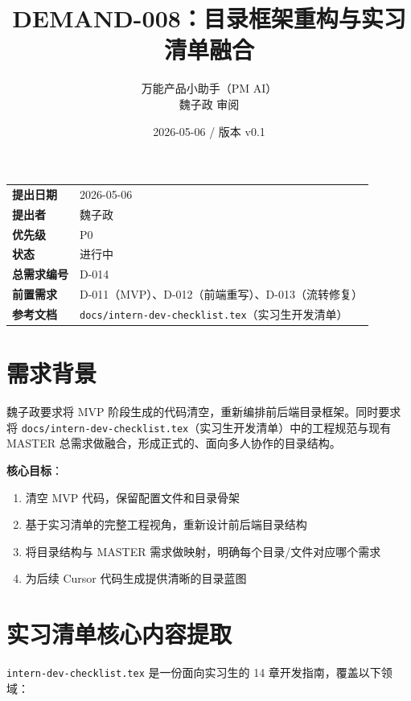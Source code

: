 \documentclass[11pt,a4paper]{article}
\title{\textbf{DEMAND-008：目录框架重构与实习清单融合}}
\author{万能产品小助手（PM AI）\\魏子政 审阅}
\date{2026-05-06 / 版本 v0.1}
\begin{document}
\maketitle

\begin{center}
\begin{tabular}{>{\bfseries}p{3cm} p{10cm}}
\toprule
提出日期 & 2026-05-06 \\
提出者 & 魏子政 \\
优先级 & \textcolor{danger}{P0} \\
状态 & \textcolor{progress}{进行中} \\
总需求编号 & D-014 \\
前置需求 & D-011（MVP）、D-012（前端重写）、D-013（流转修复） \\
参考文档 & \texttt{docs/intern-dev-checklist.tex}（实习生开发清单） \\
\bottomrule
\end{tabular}
\end{center}

\vspace{1em}

\section{需求背景}

魏子政要求将 MVP 阶段生成的代码清空，重新编排前后端目录框架。同时要求将 \texttt{docs/intern-dev-checklist.tex}（实习生开发清单）中的工程规范与现有 MASTER 总需求做融合，形成正式的、面向多人协作的目录结构。

\textbf{核心目标}：
\begin{enumerate}[nosep]
  \item 清空 MVP 代码，保留配置文件和目录骨架
  \item 基于实习清单的完整工程视角，重新设计前后端目录结构
  \item 将目录结构与 MASTER 需求做映射，明确每个目录/文件对应哪个需求
  \item 为后续 Cursor 代码生成提供清晰的目录蓝图
\end{enumerate}

\section{实习清单核心内容提取}

\texttt{intern-dev-checklist.tex} 是一份面向实习生的 14 章开发指南，覆盖以下领域：
\end{document}

